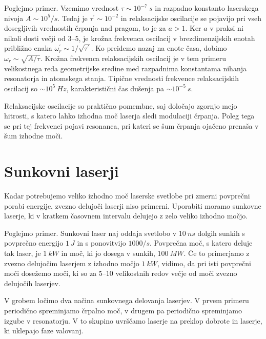 Poglejmo primer. Vzemimo vrednost $\tau \sim 10^{-7}~\si{s}$ in razpadno
konstanto laserskega nivoja $A \sim 10^5/\si{s}$. Tedaj je $\tau^{\prime}\sim 10^{-2}$ 
in relaksacijske oscilacije se pojavijo pri vseh dosegljivih vrednostih črpanja 
nad pragom, to je za $a>1$. Ker $a$ v praksi ni nikoli dosti večji od $3$--$5$, 
je krožna frekvenca oscilacij v brezdimenzijskih enotah približno
enaka $\omega^{\prime}_r\sim 1/\sqrt{\tau^{\prime}}$. Ko preidemo
nazaj na enote časa, dobimo $\omega_r\sim \sqrt{A/\tau}$. Krožna frekvenca 
relaksacijskih oscilacij je v tem primeru velikostnega reda geometrijske 
sredine med razpadnima konstantama nihanja resonatorja in atomskega stanja. 
Tipične vrednosti frekvence relaksacijskih oscilacij so $\sim 10^5~\si{Hz}$, 
karakteristični čas dušenja pa $\sim 10^{-5}~\si{s}$.
\begin{remark}
Relaksacijske oscilacije so praktično pomembne, saj določajo zgornjo mejo
hitrosti, s katero lahko izhodna moč laserja sledi modulaciji črpanja.
Poleg tega se pri tej frekvenci pojavi resonanca, pri kateri se šum črpanja
ojačeno prenaša v šum izhodne moči. 
\end{remark}

\section{Sunkovni laserji}
Kadar potrebujemo veliko izhodno moč laserske svetlobe pri zmerni povprečni porabi 
energije, zvezno delujoči laserji 
niso primerni. Uporabiti moramo sunkovne laserje, 
ki v kratkem časovnem intervalu delujejo z zelo veliko izhodno močjo. 

Poglejmo primer. 
Sunkovni laser naj oddaja svetlobo v $10~\si{ns}$ dolgih sunkih 
s povprečno energijo $1~\si{J}$ in s ponovitvijo $1000/\si{s}$.
Povprečna moč, s katero deluje tak laser, je $1~\si{kW}$ in moč, ki jo 
dosega v sunkih, $100~\si{MW}$. Če to primerjamo z zvezno delujočim laserjem  
z izhodno močjo $1~\si{kW}$, vidimo, da pri isti povprečni moči
dosežemo moči, ki so za $5$--$10$ velikostnih redov večje od moči 
zvezno delujočih laserjev. 

V grobem ločimo dva načina sunkovnega delovanja laserjev. V prvem primeru
periodično spreminjamo črpalno moč, v drugem pa periodično 
spreminjamo izgube v resonatorju. V to skupino uvrščamo laserje na 
preklop dobrote in laserje, ki uklepajo faze valovanj.   

